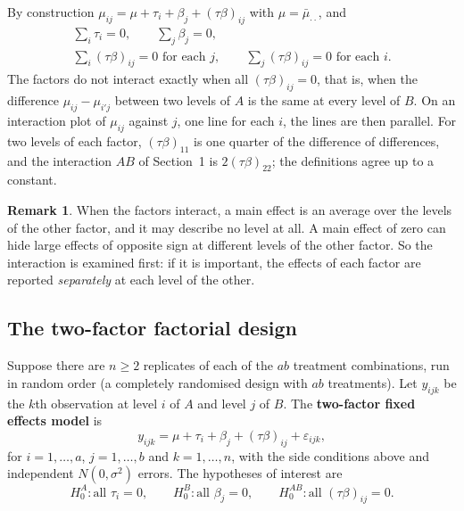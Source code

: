 \documentclass[11pt,a4paper]{article}
\numberwithin{equation}{section}
\theoremstyle{definition}
\newtheorem*{remark}{Remark}
\begin{document}
By construction $\mu_{ij} = \mu + \tau_i + \beta_j + (\tau\beta)_{ij}$ with $\mu = \bar\mu_{\cdot\cdot}$, and
\begin{gather*}
\sum_i\tau_i = 0 , \qquad \sum_j\beta_j = 0 , \\
\sum_i(\tau\beta)_{ij} = 0 \text{ for each } j , \qquad \sum_j(\tau\beta)_{ij} = 0 \text{ for each } i .
\end{gather*}
The factors do not interact exactly when all $(\tau\beta)_{ij} = 0$, that is, when the difference $\mu_{ij} - \mu_{i'j}$ between two levels of $A$ is the same at every level
of $B$. On an interaction plot of $\mu_{ij}$ against $j$, one line for each $i$, the lines are then parallel. For two levels of each factor, $(\tau\beta)_{11}$ is one quarter
of the difference of differences, and the interaction $AB$ of Section~1 is $2(\tau\beta)_{22}$; the definitions agree up to a constant.

\begin{remark}
When the factors interact, a main effect is an average over the levels of the other factor, and it may describe no level at all. A main effect of
zero can hide large effects of opposite sign at different levels of the other factor. So the interaction is examined first: if it is important, the
effects of each factor are reported \emph{separately} at each level of the other.
\end{remark}

\subsection{The two-factor factorial design}
Suppose there are $n \ge 2$ replicates of each of the $ab$ treatment combinations, run in random order (a completely randomised design with $ab$
treatments). Let $y_{ijk}$ be the $k$th observation at level $i$ of $A$ and level $j$ of $B$. The \textbf{two-factor fixed effects model} is
\[
y_{ijk} = \mu + \tau_i + \beta_j + (\tau\beta)_{ij} + \varepsilon_{ijk} ,
\]
for $i = 1, \dots, a$, $j = 1, \dots, b$ and $k = 1, \dots, n$, with the side conditions above and independent $N(0, \sigma^2)$ errors. The hypotheses of interest are
\[
H_0^A : \text{all } \tau_i = 0 , \qquad H_0^B : \text{all } \beta_j = 0 , \qquad H_0^{AB} : \text{all } (\tau\beta)_{ij} = 0 .
\]
\end{document}
